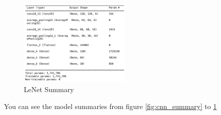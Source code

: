 \begin{figure}
    \centering
    \includegraphics[width=0.48\textwidth]{Images/lenet_summary.png}
    \caption{LeNet Summary}
    \label{fig:lenet_summary}
\end{figure}
You can see the model summaries from figure \cref{fig:cnn_summary} to \cref{fig:lenet_summary}
